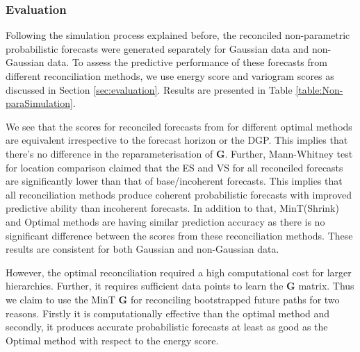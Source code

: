 \documentclass[12pt]{article}
\theoremstyle{definition}
\begin{document}
\subsubsection{Evaluation}

Following the simulation process explained before, the reconciled non-parametric probabilistic forecasts were generated separately for Gaussian data and non-Gaussian data. To assess the predictive performance of these forecasts from different reconciliation methods, we use energy score and variogram scores as discussed in Section \ref{sec:evaluation}. Results are presented in Table \ref{table:Non-paraSimulation}. 

We see that the scores for reconciled forecasts from for different optimal methods are equivalent irrespective to the forecast horizon or the DGP. This implies that there's no difference in the reparameterisation of $\bm{G}$. Further, Mann-Whitney test for location comparison claimed that the ES and VS for all reconciled forecasts are significantly lower than that of base/incoherent forecasts. This implies that all reconciliation methods produce coherent probabilistic forecasts with improved predictive ability than incoherent forecasts. In addition to that, MinT(Shrink) and Optimal methods are having similar prediction accuracy as there is no significant difference between the scores from these reconciliation methods. These results are consistent for both Gaussian and non-Gaussian data. 

However, the optimal reconciliation required a high computational cost for larger hierarchies. Further, it requires sufficient data points to learn the $\bm{G}$ matrix. Thus we claim to use the MinT $\bm{G}$ for reconciling bootstrapped future paths for two reasons. Firstly it is computationally effective than the optimal method and secondly, it produces accurate probabilistic forecasts at least as good as the Optimal method with respect to the energy score. 
\end{document}
